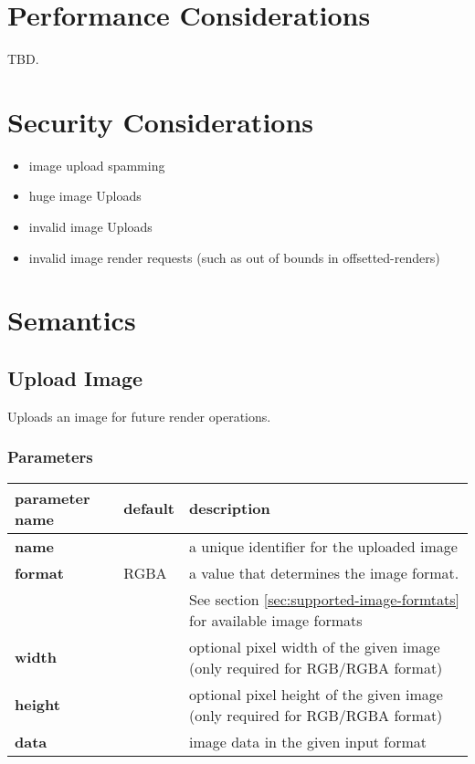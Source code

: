 \documentclass[a4paper]{article}
\begin{document}

\section{Performance Considerations} %

TBD.

\section{Security Considerations} %

\begin{itemize}
    \item image upload spamming
    \item huge image Uploads
    \item invalid image Uploads
    \item invalid image render requests (such as out of bounds in offsetted-renders)
\end{itemize}

\section{Semantics} %

\subsection{Upload Image}

Uploads an image for future render operations.

\subsubsection*{Parameters}

\begin{tabular}{|l|l|l|}
  \hline
  \textbf{parameter name} & \textbf{default} & \textbf{description} \\
  \hline
  \textbf{name}           &                  & a unique identifier for the uploaded image \\
  \textbf{format}         & RGBA             & a value that determines the image format. \\
                          &                  & See section \ref{sec:supported-image-formtats} for available image formats \\
  \textbf{width}          &                  & optional pixel width of the given image (only required for RGB/RGBA format) \\
  \textbf{height}         &                  & optional pixel height of the given image (only required for RGB/RGBA format) \\
  \textbf{data}           &                  & image data in the given input format \\
  \hline
\end{tabular}
\end{document}
